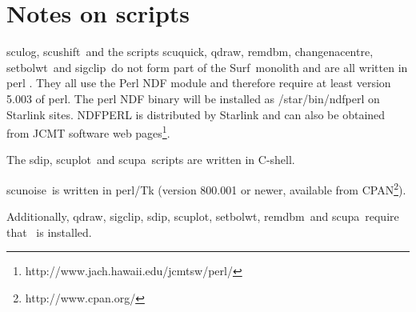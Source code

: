 \documentclass[twoside,11pt]{article}
\newcommand{\scusoft}          {{\sc Surf}}
\newcommand{\Kappa}{\xref{{\sc{Kappa}}}{sun95}{}}
\newcommand{\task}[1]{{\sf #1}}
\newcommand{\scuquick}{\htmlref{\task{scuquick}}{SCUQUICK}}
\newcommand{\sculog}{\htmlref{\task{sculog}}{SCULOG}}
\newcommand{\qdraw}{\htmlref{\task{qdraw}}{QDRAW}}
\newcommand{\sigclip}{\htmlref{\task{sigclip}}{SIGCLIP}}
\newcommand{\sdip}{\htmlref{\task{sdip}}{SDIP}}
\newcommand{\scupa}{\htmlref{\task{scupa}}{SCUPA}}
\newcommand{\scushift}{\htmlref{\task{scushift}}{SCUSHIFT}}
\newcommand{\scuplot}{\htmlref{\task{scuplot}}{SCUPLOT}}
\newcommand{\remdbm}{\htmlref{\task{remdbm}}{REMDBM}}
\newcommand{\chgnacent}{\htmlref{\task{change\_nacentre}}{CHANGE_NACENTRE}}
\newcommand{\scunoise}{\htmlref{\task{scunoise}}{SCUNOISE}}
\newcommand{\setbolwt}{\htmlref{\task{setbolwt}}{SETBOLWT}}
\newcommand{\htmladdnormallinkfoot}[2]{#1\footnote{#2}}
\newcommand{\htmlref}[2]{#1}
\newcommand{\xref}[3]{#1}
\newcommand{\xlabel}[1]{}
\renewcommand{\_}{\texttt{\symbol{95}}}
\begin{document}
\section{\xlabel{ndfperl}Notes on scripts\label{ndfperl}}

\sculog, \scushift\ and the scripts \scuquick, \qdraw, \remdbm, \chgnacent,
\setbolwt\  and \sigclip\ do not form part of
the \scusoft\ monolith and are all written in perl \cite{Perl}. They all use
the \xref{Perl NDF module}{sun222}{} \cite{ndfperl}  and therefore require at least version 5.003 of perl. The
perl NDF binary will be installed as /star/bin/ndfperl on Starlink sites.
\xref{NDFPERL}{sun222}{} is distributed by Starlink and 
can also be obtained from
\htmladdnormallinkfoot{JCMT software web pages}{http://www.jach.hawaii.edu/jcmt\_sw/perl/}.

The \sdip, \scuplot\ and \scupa\ scripts are written in C-shell.

\scunoise\ is written in perl/Tk (version 800.001 or newer, available from
\htmladdnormallinkfoot{CPAN}{http://www.cpan.org/}).

Additionally, \qdraw, \sigclip, \sdip, \scuplot, \setbolwt, \remdbm\ and 
\scupa\ require that \Kappa\ is installed.
\end{document}
